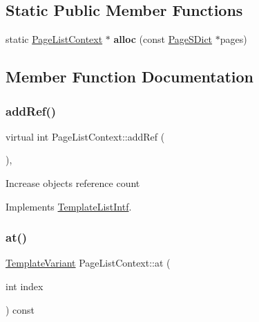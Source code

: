 \subsection*{Static Public Member Functions}
\begin{DoxyCompactItemize}
\item 
\mbox{\label{class_page_list_context_a7d69ff1bb4178520525520060ab567af}} 
static \mbox{\hyperlink{class_page_list_context}{Page\+List\+Context}} $\ast$ {\bfseries alloc} (const \mbox{\hyperlink{class_page_s_dict}{Page\+S\+Dict}} $\ast$pages)
\end{DoxyCompactItemize}


\subsection{Member Function Documentation}
\mbox{\label{class_page_list_context_afd248c2c11a415e6e62150580d3ec366}} 
\subsubsection{\texorpdfstring{addRef()}{addRef()}}
{\footnotesize\ttfamily virtual int Page\+List\+Context\+::add\+Ref (\begin{DoxyParamCaption}{ }\end{DoxyParamCaption})\hspace{0.3cm}{\ttfamily [inline]}, {\ttfamily [virtual]}}

Increase object\textquotesingle{}s reference count 

Implements \mbox{\hyperlink{class_template_list_intf_a4b4973e2e15396d10bc4e3085462ca2b}{Template\+List\+Intf}}.

\mbox{\label{class_page_list_context_adb8538bc8c1206e15372209d7e3379dc}} 
\subsubsection{\texorpdfstring{at()}{at()}}
{\footnotesize\ttfamily \mbox{\hyperlink{class_template_variant}{Template\+Variant}} Page\+List\+Context\+::at (\begin{DoxyParamCaption}\item[{int}]{index }\end{DoxyParamCaption}) const\hspace{0.3cm}{\ttfamily [virtual]}}

